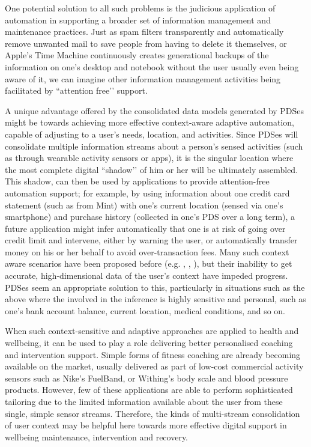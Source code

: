\documentclass[graybox]{svmult}
\begin{document}
One potential solution to all such problems is the judicious application of automation in supporting a broader set of information management and maintenance practices.  Just as spam filters transparently and automatically remove unwanted mail to save people from having to delete it themselves, or Apple’s Time Machine continuously creates generational backups of the information on one’s desktop and notebook without the user usually even being aware of it, we can imagine other information management activities being facilitated by ``attention free’’ support.  

A unique advantage offered by the consolidated data models generated by PDSes might be towards achieving more effective context-aware adaptive automation, capable of adjusting to a user’s needs, location, and activities.  Since PDSes will consolidate multiple information streams about a person’s sensed activities (such as through wearable activity sensors or apps),  it is the singular location where the most complete digital ``shadow’’ of him or her will be ultimately assembled.  This shadow, can then be used by applications to provide attention-free automation support; for example, by using information about one credit card statement (such as from Mint) with one’s current location (sensed via one’s smartphone) and purchase history (collected in one’s PDS over a long term), a future application might infer automatically that one is at risk of going over credit limit and intervene, either by warning the user, or automatically transfer money on his or her behalf to avoid over-transaction fees.  Many such context aware scenarios have been proposed before (e.g. \cite{selker2000context}, \cite{schilit1994context}, \cite{dey2001understanding}), but their inability to get accurate, high-dimensional data of the user’s context have impeded progress.  PDSes seem an appropriate solution to this, particularly in situations such as the above where the involved in the inference is highly sensitive and personal, such as one’s bank account balance, current location, medical conditions, and so on. 

When such context-sensitive and adaptive approaches are applied to health and wellbeing, it can be used to play a role delivering better personalised coaching and intervention support.  Simple forms of fitness coaching are already becoming available on the market, usually delivered as part of low-cost commercial activity sensors such as Nike’s FuelBand, or Withing’s body scale and blood pressure products. However, few of these applications are able to perform sophisticated tailoring due to the limited information available about the user from these single, simple sensor streams.  Therefore, the kinds of multi-stream consolidation of user context may be helpful here towards more effective digital support in wellbeing maintenance, intervention and recovery.
\end{document}
